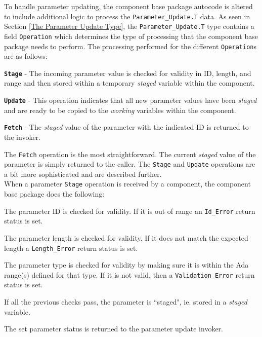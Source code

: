 To handle parameter updating, the component base package autocode is altered to include additional logic to process the \texttt{Parameter\_Update.T} data. As seen in Section \ref{The Parameter Update Type}, the \texttt{Parameter\_Update.T} type contains a field \texttt{Operation} which determines the type of processing that the component base package needs to perform. The processing performed for the different \texttt{Operation}s are as follows:

\vspace{5mm} %
\begin{spaceditemize}
  \item \textbf{\texttt{Stage}} - The incoming parameter value is checked for validity in ID, length, and range and then stored within a temporary \textit{staged} variable within the component.
  \item \textbf{\texttt{Update}} - This operation indicates that all new parameter values have been \textit{staged} and are ready to be copied to the \textit{working} variables within the component.
  \item \textbf{\texttt{Fetch}} - The \textit{staged} value of the parameter with the indicated ID is returned to the invoker.
\end{spaceditemize}
\vspace{5mm} %

The \texttt{Fetch} operation is the most straightforward. The current \textit{staged} value of the parameter is simply returned to the caller. The \texttt{Stage} and \texttt{Update} operations are a bit more sophisticated and are described further. \\

When a parameter \texttt{Stage} operation is received by a component, the component base package does the following:

\vspace{5mm} %
\begin{spacedenumerate}
  \item The parameter ID is checked for validity. If it is out of range an \texttt{Id\_Error} return status is set.
  \item The parameter length is checked for validity. If it does not match the expected length a \texttt{Length\_Error} return status is set.
  \item The parameter type is checked for validity by making sure it is within the Ada range(s) defined for that type. If it is not valid, then a \texttt{Validation\_Error} return status is set.
  \item If all the previous checks pass, the parameter is ``staged", ie. stored in a \textit{staged} variable.
  \item The set parameter status is returned to the parameter update invoker.
\end{spacedenumerate}
\vspace{5mm} %

